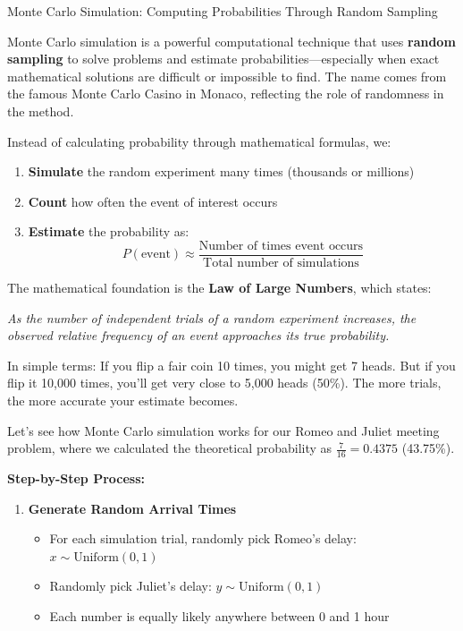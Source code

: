 \begin{keyconceptboxbreak}{Monte Carlo Simulation: Computing Probabilities Through Random Sampling}


Monte Carlo simulation is a powerful computational technique that uses \textbf{random sampling} to solve problems and estimate probabilities—especially when exact mathematical solutions are difficult or impossible to find. The name comes from the famous Monte Carlo Casino in Monaco, reflecting the role of randomness in the method.


Instead of calculating probability through mathematical formulas, we:
\begin{enumerate}
    \item \textbf{Simulate} the random experiment many times (thousands or millions)
    \item \textbf{Count} how often the event of interest occurs
    \item \textbf{Estimate} the probability as:
    \[
    P(\text{event}) \approx \frac{\text{Number of times event occurs}}{\text{Total number of simulations}}
    \]
\end{enumerate}


The mathematical foundation is the \textbf{Law of Large Numbers}, which states:

\textit{As the number of independent trials of a random experiment increases, the observed relative frequency of an event approaches its true probability.}

In simple terms: If you flip a fair coin 10 times, you might get 7 heads. But if you flip it 10,000 times, you'll get very close to 5,000 heads (50\%). The more trials, the more accurate your estimate becomes.


Let's see how Monte Carlo simulation works for our Romeo and Juliet meeting problem, where we calculated the theoretical probability as $\frac{7}{16} = 0.4375$ (43.75\%).

\textbf{Step-by-Step Process:}

\begin{enumerate}
    \item \textbf{Generate Random Arrival Times}
    \begin{itemize}
        \item For each simulation trial, randomly pick Romeo's delay: $x \sim \text{Uniform}(0, 1)$
        \item Randomly pick Juliet's delay: $y \sim \text{Uniform}(0, 1)$
        \item Each number is equally likely anywhere between 0 and 1 hour
    \end{itemize}


\end{enumerate}
\end{keyconceptboxbreak}
